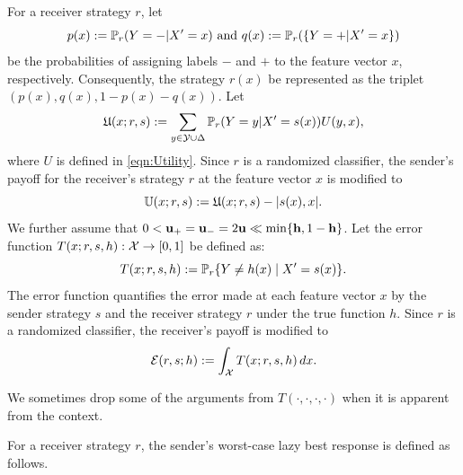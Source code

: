 For a receiver strategy $r$, let
$$p(x) := \mathbb{P}_r(Y=\mathbf{-}|X'=x) \text{ and } q(x) := \mathbb{P}_r(\{Y=\mathbf{+}|X'=x\})$$
be the probabilities of assigning labels $-$ and $+$ to the feature vector $x$, respectively. Consequently, the strategy $r(x)$ be represented as the triplet $(p(x), q(x), 1 - p(x) - q(x))$. Let $$\mathfrak{U}(x;r,s) := \sum_{y \in \mathcal{Y}\cup \Delta}\mathbb{P}_r(Y=y|X'=s(x))U(y,x),$$ where $U$ is defined in \eqref{eqn:Utility}.
Since $r$ is a randomized classifier, the sender's payoff for the receiver's strategy $r$ at the feature vector $x$ is modified to
\begin{equation*}
	\mathbb{U}(x; r, s) := \mathfrak{U}(x;r,s)-|s(x),x|.
\end{equation*}
We further assume that $0 < \mathbf{u_+} = \mathbf{u_-} = 2\mathbf{u} \ll \min\{\mathbf{h},1-\mathbf{h}\}$. Let the error function $T(x; r, s, h): \mathcal{X} \to [0,1]$ be defined as:
\begin{equation}\label{eqn:error function}
    T(x; r, s, h) := \mathbb{P}_{r} \{Y\neq h(x) \mid X' = s(x)\}.
\end{equation}
The error function quantifies the error made at each feature vector $x$ by the sender strategy $s$ and the receiver strategy $r$ under the true function $h$. Since $r$ is a randomized classifier, the receiver's payoff is modified to
\begin{equation}\label{eqn:Receiver_average_error}
	\mathcal{E}(r, s; h) := \int_{\mathcal{X}} T(x; r, s, h) \, dx.
\end{equation}

\begin{notn}
    We sometimes drop some of the arguments from $T(\cdot, \cdot, \cdot, \cdot)$ when it is apparent from the context.
\end{notn}

For a receiver strategy $r$, the sender's worst-case lazy best response is defined as follows.

